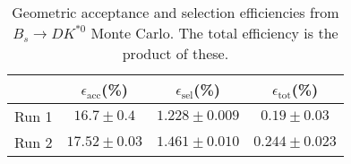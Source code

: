 \begin{table}
    \centering
    \begin{tabular}{cccc}
        \toprule
        & $\epsilon_\mathrm{acc}$(\%) &  $\epsilon_\mathrm{sel}$(\%) &  $\epsilon_\mathrm{tot}$(\%) \\
        \midrule
        Run 1 & $16.7 \pm 0.4$ & $1.228 \pm 0.009$ & $0.19 \pm 0.03$ \\
        Run 2 & $17.52 \pm 0.03$ & $1.461 \pm 0.010$ & $0.244 \pm 0.023$ \\
        \bottomrule
    \end{tabular}
    \caption{Geometric acceptance and selection efficiencies from  $B_s \to DK^{*0}$ Monte Carlo. The total efficiency is the  product of these.}
\label{tab:selection_efficiency_Bs}
\end{table}
